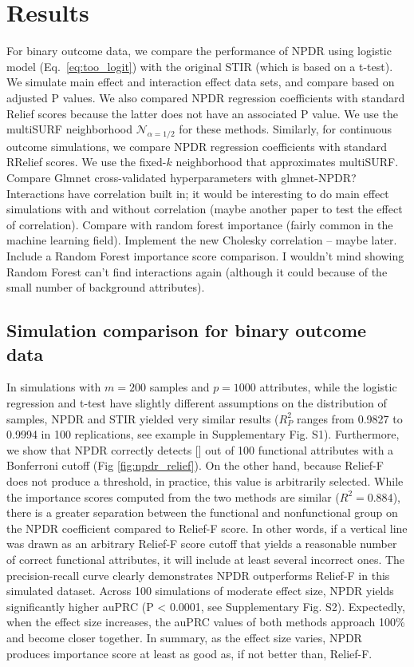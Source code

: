 \documentclass[10pt]{article}
\begin{document}

\section{Results}
For binary outcome data, we compare the performance of NPDR using logistic model (Eq.~\ref{eq:too_logit}) with the original STIR (which is based on a t-test).
We simulate main effect and interaction effect data sets, and compare based on adjusted P values.
We also compared NPDR regression coefficients with standard Relief scores because the latter does not have an associated P value. We use the multiSURF neighborhood $\mathcal{N}_{\alpha=1/2}$ for these methods.
Similarly, for continuous outcome simulations, we compare NPDR regression coefficients with standard RRelief scores. We use the fixed-$k$ neighborhood that approximates multiSURF. Compare Glmnet cross-validated hyperparameters with glmnet-NPDR? Interactions have correlation built in; it would be interesting to do main effect simulations with and without correlation (maybe another paper to test the effect of correlation). Compare with random forest importance (fairly common in the machine learning field). Implement the new Cholesky correlation -- maybe later. Include a Random Forest importance score comparison. I wouldn't mind showing Random Forest can't find interactions again (although it could because of the small number of background attributes). 

\subsection{Simulation comparison for binary outcome data} 
In simulations with $m = 200$ samples and $p = 1000$ attributes, while the logistic regression and t-test have slightly different assumptions on the distribution of samples, NPDR and STIR yielded very similar results ($R_P^2$ ranges from 0.9827 to 0.9994 in 100 replications, see example in Supplementary Fig. S1).
Furthermore, we show that NPDR correctly detects [] out of 100 functional attributes with a Bonferroni cutoff (Fig \ref{fig:npdr_relief}).
On the other hand, because Relief-F does not produce a threshold, in practice, this value is arbitrarily selected.
While the importance scores computed from the two methods are similar ($R^2 = 0.884$), there is a greater separation between the functional and nonfunctional group on the NPDR coefficient compared to Relief-F score.
In other words, if a vertical line was drawn as an arbitrary Relief-F score cutoff that yields a reasonable number of correct functional attributes, it will include at least several incorrect ones. 
The precision-recall curve clearly demonstrates NPDR outperforms Relief-F in this simulated dataset.
Across 100 simulations of moderate effect size, NPDR yields significantly higher auPRC (P < 0.0001, see Supplementary Fig. S2).
Expectedly, when the effect size increases, the auPRC values of both methods approach 100\% and become closer together.
In summary, as the effect size varies, NPDR produces importance score at least as good as, if not better than, Relief-F.
\end{document}
